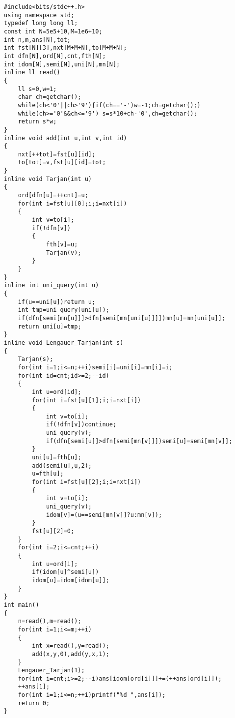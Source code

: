 \begin{verbatim}
#include<bits/stdc++.h>
using namespace std;
typedef long long ll;
const int N=5e5+10,M=1e6+10;
int n,m,ans[N],tot;
int fst[N][3],nxt[M+M+N],to[M+M+N];
int dfn[N],ord[N],cnt,fth[N];
int idom[N],semi[N],uni[N],mn[N];
inline ll read()
{
	ll s=0,w=1;
	char ch=getchar();
	while(ch<'0'||ch>'9'){if(ch=='-')w=-1;ch=getchar();}
	while(ch>='0'&&ch<='9') s=s*10+ch-'0',ch=getchar();
	return s*w;
}
inline void add(int u,int v,int id)
{
	nxt[++tot]=fst[u][id];
	to[tot]=v,fst[u][id]=tot;
}
inline void Tarjan(int u)
{
	ord[dfn[u]=++cnt]=u;
	for(int i=fst[u][0];i;i=nxt[i])
	{
		int v=to[i];
		if(!dfn[v])
		{
			fth[v]=u;
			Tarjan(v);
		}
	}
}
inline int uni_query(int u)
{
	if(u==uni[u])return u;
	int tmp=uni_query(uni[u]);
	if(dfn[semi[mn[u]]]>dfn[semi[mn[uni[u]]]])mn[u]=mn[uni[u]];
	return uni[u]=tmp;
}
inline void Lengauer_Tarjan(int s)
{
	Tarjan(s);
	for(int i=1;i<=n;++i)semi[i]=uni[i]=mn[i]=i;
	for(int id=cnt;id>=2;--id)
	{
		int u=ord[id];
		for(int i=fst[u][1];i;i=nxt[i])
		{
			int v=to[i];
			if(!dfn[v])continue;
			uni_query(v);
			if(dfn[semi[u]]>dfn[semi[mn[v]]])semi[u]=semi[mn[v]];
		}
		uni[u]=fth[u];
		add(semi[u],u,2);
		u=fth[u];
		for(int i=fst[u][2];i;i=nxt[i])
		{
			int v=to[i];
			uni_query(v);
			idom[v]=(u==semi[mn[v]]?u:mn[v]);
		}
		fst[u][2]=0;
	}
	for(int i=2;i<=cnt;++i)
	{
		int u=ord[i];
		if(idom[u]^semi[u])
		idom[u]=idom[idom[u]];
	}
}
int main()
{
	n=read(),m=read();
	for(int i=1;i<=m;++i)
	{
		int x=read(),y=read();
		add(x,y,0),add(y,x,1);
	}
	Lengauer_Tarjan(1);
	for(int i=cnt;i>=2;--i)ans[idom[ord[i]]]+=(++ans[ord[i]]);
	++ans[1];
	for(int i=1;i<=n;++i)printf("%d ",ans[i]);
	return 0;
}
\end{verbatim}

